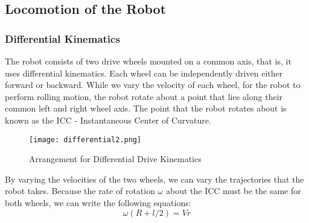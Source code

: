 \subsection{Locomotion of the Robot}
\subsubsection{Differential Kinematics}
\justify
The robot consists of two drive wheels mounted on a common axis, that is, it uses differential kinematics. Each wheel can be independently driven either forward or backward. While we vary the velocity of each wheel, for the robot to perform rolling motion, the robot rotate about a point that lies along their common left and right wheel axis. The point that the robot rotates about is known as the ICC - Instantaneous Center of Curvature.\\
\begin{figure}[h]
\center
\texttt{[image: differential2.png]}    
\caption{Arrangement for Differential Drive Kinematics}
\end{figure}
\justify 
By varying the velocities of the two wheels, we can vary the trajectories that the robot takes.
Because the rate of rotation $\omega$ about the ICC must be the same for both wheels, we can write the
following equations:\\
\begin{equation}
                                                                         		\omega(R+l/2)= Vr                                             
\end{equation}

